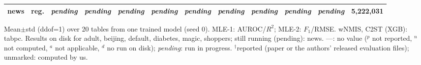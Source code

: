 \begin{table}[t]
{\begin{tabular}{llcccccccccc}
news & reg. & \emph{pending} & \emph{pending} & \emph{pending} & \emph{pending} & \emph{pending} & \emph{pending} & \emph{pending} & \emph{pending} & \emph{pending} & 5{,}222{,}031 \\
\bottomrule
\end{tabular}}
\par\smallskip\footnotesize Mean$\pm$std (ddof=1) over 20 tables from one trained model (seed 0). MLE-1: AUROC/$R^2$; MLE-2: $F_1$/RMSE. wNMIS, C2ST (XGB): tabpc. Results on disk for adult, beijing, default, diabetes, magic, shoppers; still running (pending): news. ---: no value ($^{p}$ not reported, $^{n}$ not computed, $^{a}$ not applicable, $^{d}$ no run on disk); \emph{pending}: run in progress. $^\dagger$reported (paper or the authors' released evaluation files); unmarked: computed by us.
\end{table}
